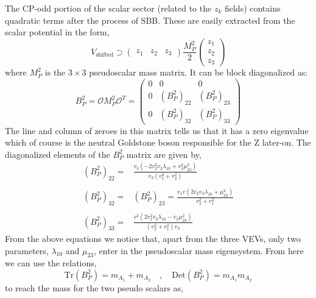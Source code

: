 The CP-odd portion of the scalar sector (related to the $z_k$ fields) contains quadratic terms after the process of SBB. These are easily extracted from the scalar potential in the form, 
%
\begin{equation}
V_{\text{shifted}} \supset \left( \begin{array}{ccc} z_1 & z_2 & z_3 \end{array} \right) \frac{M_P^2}{2} \left( \begin{array}{c} z_1 \\ z_2 \\ z_3 \end{array} \right)  
\end{equation}
%
where $M_P^2$ is the $3\times3$ pseudoscalar mass matrix. It can be block diagonalized as:
%
\begin{equation}
B^2_P = \mathcal{O} M_P^2 \mathcal{O}^T = \left( \begin{array}{ccc}
0 & 0 & 0 \\ 
0 & \left( B^2_P \right)_{22} &  \left( B^2_P \right)_{23} \\
0 & \left( B^2_P \right)_{32} &  \left( B^2_P \right)_{33}
\end{array} \right) 
\end{equation}
%
The line and column of zeroes in this matrix tells us that it has a zero eigenvalue which of course is the neutral Goldstone boson responsible for the Z later-on.
%
The diagonalized elements of the $B^2_P$ matrix are given by,
\begin{equation}
\begin{split}
\left( B^2_P \right)_{22} = &  \frac{ 
v_3 \left( -2 v^3_2 v_3 \lambda_10 +  v_1^2 \mu_{23}^2 \right) } 
{v_2 \left( v_1^2 + v_2^2 \right)  }  
\\
\\ 
\left( B^2_P \right)_{32} = & \left( B^2_P \right)_{23} = \frac{v_1 v \left( 2 v_2 v_3 \lambda_{10} + \mu_{23}^2 \right) }{v_2^2 + v_1^2} \\
\\
\left( B^2_P \right)_{33} = & \frac{v^2 \left( 2 v_1^2 v_3 \lambda_{10} - v_2 \mu_{23}^2 \right) }{\left( v_2^2 + v_1^2\right) v_3 }
\end{split} 
\end{equation}
From the above equations we notice that, apart from the three VEVs, only two parameters, $\lambda_10$ and $\mu_23$, enter in the pseudoscalar mass eigensystem. 
%
From here we can use the relations, 
\begin{equation}
\mathrm{Tr} ( B_P^2 ) = m_{A_1} + m_{A_2}\quad , \quad  \mathrm{Det}( B_P^2 ) =  m_{A_1}  m_{A_2}
\end{equation}
to reach the mass for the two pseudo scalars as, 

